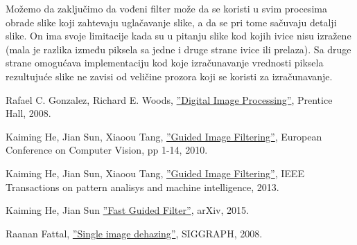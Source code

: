 \documentclass[a4paper,12pt,titlepage]{article}
\begin{document}
Možemo da zaključimo da vođeni filter može da se koristi u svim procesima obrade slike koji zahtevaju uglačavanje slike, a da se pri tome sačuvaju detalji slike. On ima svoje limitacije kada su u pitanju slike kod kojih ivice nisu izražene (mala je razlika između piksela sa jedne i druge strane ivice ili prelaza). Sa druge strane omogućava implementaciju kod koje izračunavanje vrednosti piksela rezultujuće slike ne zavisi od veličine prozora koji se koristi za izračunavanje.  

\newpage
{}
\begin{thebibliography}{10}

Rafael C. Gonzalez, Richard E. Woods,
\href{https://books.google.rs/books?id=8uGOnjRGEzoC&redir_esc=y}{''Digital Image Processing''},
Prentice Hall,
2008.

Kaiming He, Jian Sun, Xiaoou Tang,
\href{http://kaiminghe.com/publications/eccv10guidedfilter.pdf}{''Guided Image Filtering''},
European Conference on Computer Vision, pp 1-14,
2010.

Kaiming He, Jian Sun, Xiaoou Tang,
\href{http://kaiminghe.com/publications/pami12guidedfilter.pdf}{''Guided Image Filtering''},
IEEE Transactions on pattern analisys and machine intelligence,
2013.

Kaiming He, Jian Sun
\href{https://arxiv.org/pdf/1505.00996.pdf}{''Fast Guided Filter''},
arXiv,
2015.

Raanan Fattal,
\href{http://citeseerx.ist.psu.edu/viewdoc/download?doi=10.1.1.456.2558&rep=rep1&type=pdf}{''Single image dehazing''},
SIGGRAPH,
2008.

\end{thebibliography}
\end{document}
